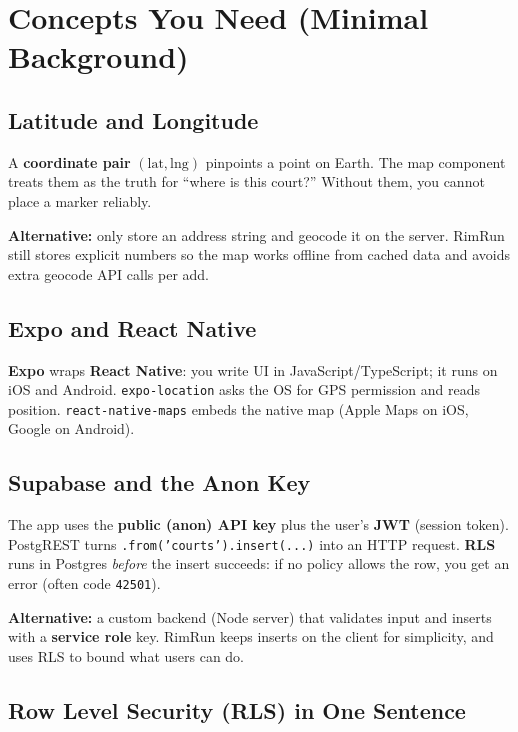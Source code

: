 \documentclass[11pt,a4paper]{article}
\begin{document}
\section{Concepts You Need (Minimal Background)}

\subsection{Latitude and Longitude}

A \textbf{coordinate pair} $(\text{lat}, \text{lng})$ pinpoints a point on Earth. The map component treats them as the truth for ``where is this court?'' Without them, you cannot place a marker reliably.

\textbf{Alternative:} only store an address string and geocode it on the server. RimRun still stores explicit numbers so the map works offline from cached data and avoids extra geocode API calls per add.

\subsection{Expo and React Native}

\textbf{Expo} wraps \textbf{React Native}: you write UI in JavaScript/TypeScript; it runs on iOS and Android. \texttt{expo-location} asks the OS for GPS permission and reads position. \texttt{react-native-maps} embeds the native map (Apple Maps on iOS, Google on Android).

\subsection{Supabase and the Anon Key}

The app uses the \textbf{public (anon) API key} plus the user's \textbf{JWT} (session token). PostgREST turns \texttt{.from('courts').insert(...)} into an HTTP request. \textbf{RLS} runs in Postgres \emph{before} the insert succeeds: if no policy allows the row, you get an error (often code \texttt{42501}).

\textbf{Alternative:} a custom backend (Node server) that validates input and inserts with a \textbf{service role} key. RimRun keeps inserts on the client for simplicity, and uses RLS to bound what users can do.

\subsection{Row Level Security (RLS) in One Sentence}
\end{document}

